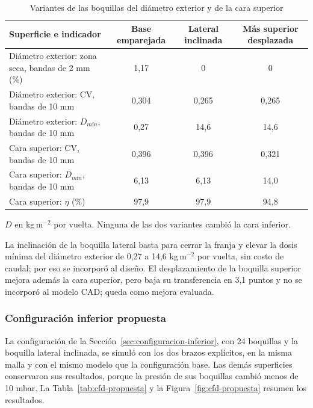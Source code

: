 \begin{table}[htbp]
\centering\small\singlespacing
\caption{Variantes de las boquillas del diámetro exterior y de la cara superior}
\label{tab:rediseno-od}
\begin{tabularx}{\textwidth}{@{}Yccc@{}}
\toprule
\textbf{Superficie e indicador} & \textbf{Base emparejada} & \textbf{Lateral inclinada} & \textbf{Más superior desplazada}\\
\midrule
Diámetro exterior: zona seca, bandas de 2 mm (\%) & 1,17 & 0 & 0\\
Diámetro exterior: CV, bandas de 10 mm & 0,304 & 0,265 & 0,265\\
Diámetro exterior: $D_{mín}$, bandas de 10 mm & 0,27 & 14,6 & 14,6\\
Cara superior: CV, bandas de 10 mm & 0,396 & 0,396 & 0,321\\
Cara superior: $D_{mín}$, bandas de 10 mm & 6,13 & 6,13 & 14,0\\
Cara superior: $\eta$ (\%) & 97,9 & 97,9 & 94,8\\
\bottomrule
\end{tabularx}
\par\smallskip\footnotesize
$D$ en kg\,m$^{-2}$ por vuelta. Ninguna de las dos variantes cambió la cara inferior.
\end{table}

La inclinación de la boquilla lateral basta para cerrar la franja y elevar la dosis mínima del diámetro exterior de 0,27 a 14,6 kg\,m$^{-2}$ por vuelta, sin costo de caudal; por eso se incorporó al diseño. El desplazamiento de la boquilla superior mejora además la cara superior, pero baja su transferencia en 3,1 puntos y no se incorporó al modelo CAD; queda como mejora evaluada.

\subsubsection{Configuración inferior propuesta}

La configuración de la Sección~\ref{sec:configuracion-inferior}, con 24 boquillas y la boquilla lateral inclinada, se simuló con los dos brazos explícitos, en la misma malla y con el mismo modelo que la configuración base. Las demás superficies conservaron sus resultados, porque la presión de sus boquillas cambió menos de 10 mbar. La Tabla~\ref{tab:cfd-propuesta} y la Figura~\ref{fig:cfd-propuesta} resumen los resultados.

